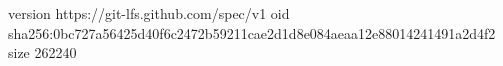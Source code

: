version https://git-lfs.github.com/spec/v1
oid sha256:0bc727a56425d40f6c2472b59211cae2d1d8e084aeaa12e88014241491a2d4f2
size 262240
